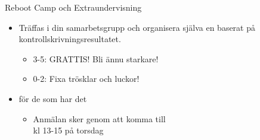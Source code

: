 \begin{Slide}{Reboot Camp och Extraundervisning}

\begin{itemize}
  \item
  Träffas i din samarbetsgrupp och organisera själva en  baserat på kontrollskrivningsresultatet.

\begin{itemize}
  \item
  3-5: GRATTIS! Bli ännu starkare!
  \item
  0-2: Fixa trösklar och luckor!
\end{itemize}

\item {} för de som har det 
\begin{itemize}
  \item Anmälan sker genom att komma till\\ kl 13-15 på torsdag
\end{itemize}

\end{itemize}


\vspace{0.5em}  \\\vspace{0.5em} 
\end{Slide}

